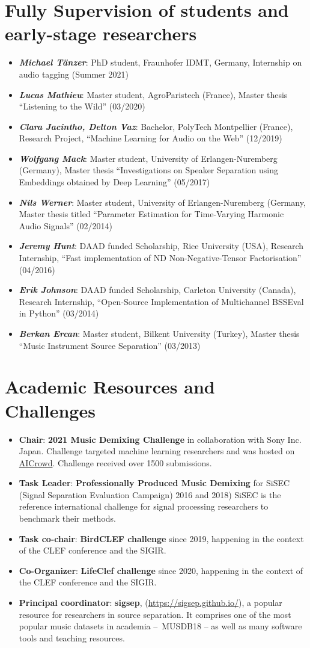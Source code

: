 \documentclass[a4paper,11pt]{article}
\newcommand{\resumeItem}[2]{
  \item\small{
    \textbf{#1}{: #2 \vspace{-2pt}}
  }
}
\newcommand{\resumeSubItem}[2]{\resumeItem{#1}{#2}\vspace{-4pt}}
\newcommand{\resumeSubHeadingListStart}{\begin{itemize}[leftmargin=*]}
\newcommand{\resumeSubHeadingListEnd}{\end{itemize}}
\begin{document}
\section{Fully Supervision of students and early-stage researchers}
  \resumeSubHeadingListStart
    \resumeSubItem{\textit{Michael Tänzer}}
    {PhD student, Fraunhofer IDMT, Germany, Internship on audio tagging (Summer 2021)}
    \resumeSubItem{\textit{Lucas Mathieu}}
    {Master student, AgroParistech (France), Master thesis ``Listening to the Wild'' (03/2020)}
    \resumeSubItem{\textit{Clara Jacintho, Delton Vaz}}
    {Bachelor, PolyTech Montpellier (France), Research Project, ``Machine Learning for Audio on the Web'' (12/2019)}
    \resumeSubItem{\textit{Wolfgang Mack}}
    {Master student, University of Erlangen-Nuremberg (Germany), Master thesis ``Investigations on Speaker Separation using Embeddings obtained by Deep Learning'' (05/2017)}
    \resumeSubItem{\textit{Nils Werner}}
    {Master student, University of Erlangen-Nuremberg (Germany, Master thesis titled ``Parameter Estimation for Time-Varying Harmonic Audio Signals'' (02/2014)}
    \resumeSubItem{\textit{Jeremy Hunt}}
    {DAAD funded Scholarship, Rice University (USA), Research Internship, ``Fast implementation of ND Non-Negative-Tensor Factorisation'' (04/2016)}
    \resumeSubItem{\textit{Erik Johnson}}
    {DAAD funded Scholarship, Carleton University (Canada), Research Internship, ``Open-Source Implementation of Multichannel BSSEval in Python'' (03/2014)}
    \resumeSubItem{\textit{Berkan Ercan}}
    {Master student, Bilkent University (Turkey), Master thesis ``Music Instrument Source Separation'' (03/2013)}
  \resumeSubHeadingListEnd

\section{Academic Resources and Challenges}
  \resumeSubHeadingListStart
  \resumeSubItem{Chair}{\textbf{2021 Music Demixing Challenge} in collaboration with Sony Inc. Japan. Challenge targeted machine learning researchers and was hosted on \href{https://www.aicrowd.com/challenges/music-demixing-challenge-ismir-2021}{AICrowd}. Challenge received over 1500 submissions.}
  \resumeSubItem{Task Leader}{\textbf{Professionally Produced Music Demixing} for SiSEC (Signal Separation Evaluation Campaign) 2016 and 2018)
  SiSEC is the reference international challenge for signal processing researchers to benchmark their methods.}
  \resumeSubItem{Task co-chair}{\textbf{BirdCLEF challenge} since 2019, happening in the context of the CLEF conference and the SIGIR.}
  \resumeSubItem{Co-Organizer}{\textbf{LifeClef challenge} since 2020, happening in the context of the CLEF conference and the SIGIR.}
  \resumeSubItem{Principal coordinator}{\textbf{sigsep}, (\url{https://sigsep.github.io/}), a popular resource for researchers in source separation.
  It comprises one of the most popular music datasets in academia – \textsc{MUSDB18} – as well as many software tools and teaching resources.}
  \resumeSubHeadingListEnd
\end{document}
